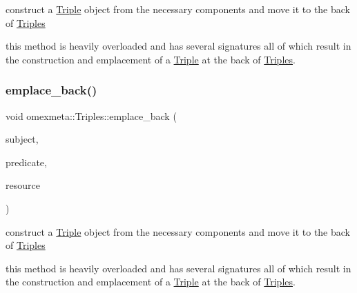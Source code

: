 construct a \hyperlink{classomexmeta_1_1Triple}{Triple} object from the necessary components and move it to the back of \hyperlink{classomexmeta_1_1Triples}{Triples} 

this method is heavily overloaded and has several signatures all of which result in the construction and emplacement of a \hyperlink{classomexmeta_1_1Triple}{Triple} at the back of \hyperlink{classomexmeta_1_1Triples}{Triples}. \mbox{\label{classomexmeta_1_1Triples_a862d672c0ac9d877261947cf5a7061db}} 
\subsubsection{\texorpdfstring{emplace\+\_\+back()}{emplace\_back()}\hspace{0.1cm}{\footnotesize\ttfamily [3/7]}}
{\footnotesize\ttfamily void omexmeta\+::\+Triples\+::emplace\+\_\+back (\begin{DoxyParamCaption}\item[{\hyperlink{classomexmeta_1_1Subject}{Subject}}]{subject,  }\item[{\hyperlink{classomexmeta_1_1BiomodelsBiologyQualifier}{Biomodels\+Biology\+Qualifier}}]{predicate,  }\item[{const \hyperlink{classomexmeta_1_1Resource}{Resource} \&}]{resource }\end{DoxyParamCaption})}



construct a \hyperlink{classomexmeta_1_1Triple}{Triple} object from the necessary components and move it to the back of \hyperlink{classomexmeta_1_1Triples}{Triples} 

this method is heavily overloaded and has several signatures all of which result in the construction and emplacement of a \hyperlink{classomexmeta_1_1Triple}{Triple} at the back of \hyperlink{classomexmeta_1_1Triples}{Triples}. \mbox{\label{classomexmeta_1_1Triples_a87cdc3aacef07c2aebbfe06342bd70f5}} 
